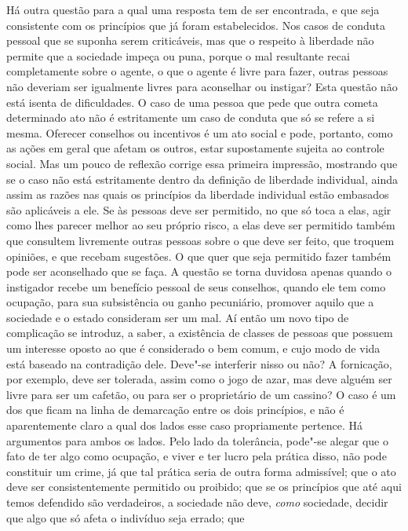 Há outra questão para a qual uma resposta tem de ser encontrada, e que
seja consistente com os princípios que já foram estabelecidos. Nos
casos de conduta pessoal que se suponha serem criticáveis, mas que o
respeito à liberdade não permite que a sociedade impeça ou puna, porque o
mal resultante recai completamente sobre o agente, o que o agente é
livre para fazer, outras pessoas não deveriam ser igualmente livres
para aconselhar ou instigar? Esta questão não está isenta de
dificuldades. O caso de uma pessoa que pede que outra cometa
determinado ato não é estritamente um caso de conduta que só se refere a
si mesma. Oferecer conselhos ou incentivos é um ato social e pode,
portanto, como as ações em geral que afetam os outros, estar
supostamente sujeita ao controle social. Mas um pouco de reflexão
corrige essa primeira impressão, mostrando que se o caso não está
estritamente dentro da definição de liberdade individual, ainda assim
as razões nas quais os princípios da liberdade individual estão
embasados são aplicáveis a ele. Se às pessoas deve ser permitido, no
que só toca a elas, agir como lhes parecer melhor ao seu próprio
risco, a elas deve ser permitido também que consultem livremente outras
pessoas sobre o que deve ser feito, que troquem opiniões, e que recebam
sugestões. O que quer que seja permitido fazer também pode ser
aconselhado que se faça. A questão se torna duvidosa apenas quando o
instigador recebe um benefício pessoal de seus conselhos, quando ele
tem como ocupação, para sua subsistência ou ganho pecuniário, promover
aquilo que a sociedade e o estado consideram ser um mal. Aí então um
novo tipo de complicação se introduz, a saber, a existência de classes
de pessoas que possuem um interesse oposto ao que é considerado o bem
comum, e cujo modo de vida está baseado na contradição dele. Deve"-se
interferir nisso ou não? A fornicação, por exemplo, deve ser
tolerada, assim como o jogo de azar, mas deve alguém ser livre para ser
um cafetão, ou para ser o proprietário de um cassino? O caso é um dos
que ficam na linha de demarcação entre os dois princípios, e não é
aparentemente claro a qual dos lados esse caso propriamente pertence.
Há argumentos para ambos os lados. Pelo lado da tolerância, pode"-se
alegar que o fato de ter algo como ocupação, e viver e ter lucro pela
prática disso, não pode constituir um crime, já que tal prática
seria de outra forma admissível; que o ato deve ser consistentemente
permitido ou proibido; que se os princípios que até aqui temos
defendido são verdadeiros, a sociedade não deve, \textit{como}
sociedade, decidir que algo que só afeta o indivíduo seja errado; que

